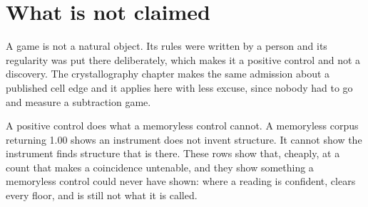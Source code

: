 \section{What is not claimed}

A game is not a natural object. Its rules were written by a person and its regularity was put there
deliberately, which makes it a positive control and not a discovery. The crystallography chapter makes
the same admission about a published cell edge and it applies here with less excuse, since nobody
had to go and measure a subtraction game.

A positive control does what a memoryless control cannot. A memoryless corpus
returning 1.00 shows an instrument does not invent structure. It cannot show the instrument finds
structure that is there. These rows show that, cheaply, at a count that makes a coincidence
untenable, and they show something a memoryless control could never have shown: where a reading is
confident, clears every floor, and is still not what it is called.

